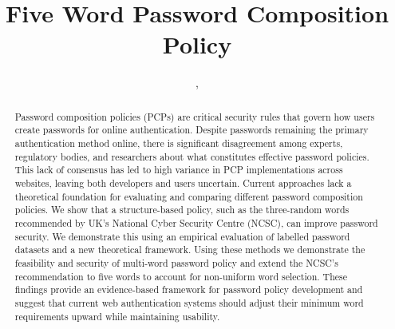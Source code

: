 \pagestyle{plain}
\title{Five Word Password Composition Policy}

\author{
	,
	\and
}


\IEEEoverridecommandlockouts
\makeatletter{}\makeatother
{}


\maketitle

\begin{abstract}
Password composition policies (PCPs) are critical security rules that govern how users create passwords for online authentication. Despite passwords remaining the primary authentication method online, there is significant disagreement among experts, regulatory bodies, and researchers about what constitutes effective password policies. This lack of consensus has led to high variance in PCP implementations across websites, leaving both developers and users uncertain. Current approaches lack a theoretical foundation for evaluating and comparing different password composition policies. We show that a structure-based policy, such as the three-random words recommended by UK's National Cyber Security Centre (NCSC), can improve password security. We demonstrate this using an empirical evaluation of labelled password datasets and a new theoretical framework. Using these methods we demonstrate the feasibility and security of multi-word password policy and extend the NCSC's recommendation to five words to account for non-uniform word selection. These findings provide an evidence-based framework for password policy development and suggest that current web authentication systems should adjust their minimum word requirements upward while maintaining usability.
\end{abstract}

